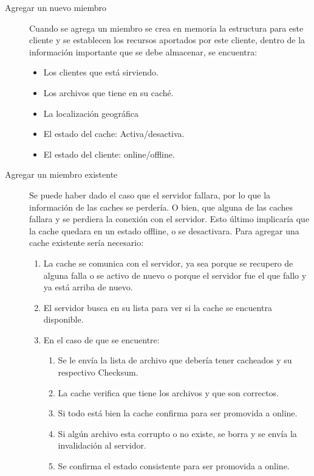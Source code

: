 \begin{description}
\item[Agregar un nuevo miembro] Cuando se agrega un miembro se crea en memoria la estructura para este cliente y se establecen los recursos aportados por este cliente, dentro de la información importante que se debe almacenar, se encuentra:
	\begin{itemize}
	\item Los clientes que está sirviendo.
	\item Los archivos que tiene en su caché.
	\item La localización geográfica 
	\item El estado del cache: Activa/desactiva.
	\item El estado del cliente: online/offline.
	\end{itemize}
	
\item [Agregar un miembro existente] Se puede haber dado el caso que el servidor fallara, por lo que la información de las caches se perdería. O bien, que alguna de las caches fallara y se perdiera la conexión con el servidor. Esto último implicaría que la cache quedara en un estado offline, o se desactivara. Para agregar una cache existente sería necesario:

	\begin{enumerate}
	\item La cache se comunica con el servidor, ya sea porque se recupero de alguna falla o se activo de nuevo o porque el servidor fue el que fallo y ya está arriba de nuevo.
	\item El servidor busca en su lista para ver si la cache se encuentra disponible.
	\item En el caso de que se encuentre:

		\begin{enumerate}
		\item Se le envía la lista de archivo que debería tener cacheados y su respectivo Checksum.
		\item La cache verifica que tiene los archivos y que son correctos.
		\item Si todo está bien la cache confirma para ser promovida a online.
		\item Si algún archivo esta corrupto o no existe, se borra y se envía la invalidación al servidor.
		\item Se confirma el estado consistente para ser promovida a online.
		\end{enumerate}	
	

\end{enumerate}
\end{description}
